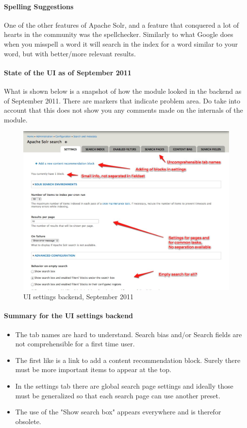 \paragraph{Spelling Suggestions}
One of the other features of Apache Solr, and a feature that conquered a lot of hearts in the community was the spellchecker. Similarly to what Google does when you misspell a word it will search in the index for a word similar to your word, but with better/more relevant results.

\paragraph{State of the UI as of September 2011} What is shown below is a snapshot of how the module looked in the backend as of September 2011. There are markers that indicate problem area. Do take into account that this does not show you any comments made on the internals of the module.
\begin{figure}[H]
     \includegraphics[width=\textwidth]{images/apachesolr_ui_backend_september_2011_1.jpg}
     \caption{UI settings backend, September 2011}
\end{figure}
\paragraph{Summary for the UI settings backend}
\begin{itemize}
\item The tab names are hard to understand. Search bias and/or Search fields are not comprehensible for a first time user.
\item The first like is a link to add a content recommendation block. Surely there must be more important items to appear at the top. 
\item In the settings tab there are global search page settings and ideally those must be generalized so that each search page can use another preset.
\item The use of the "Show search box" appears everywhere and is therefor obsolete.
\end{itemize}

